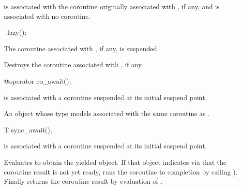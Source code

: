{\begin{itemdescr}
\pnum
\ensures
{} is associated with the coroutine
originally associated with , if any,
and  is associated with no coroutine.
\end{itemdescr}

\begin{itemdecl}
~lazy();
\end{itemdecl}

\begin{itemdescr}
\pnum
\expects
The coroutine associated with , if any, is suspended.

\pnum
\effects
Destroys the coroutine associated with , if any.
\end{itemdescr}

\begin{itemdecl}
@\unspec@ operator co_await();
\end{itemdecl}

\begin{itemdescr}
\pnum
\expects
{} is associated with a coroutine
suspended at its initial suspend point.

\returns
An object whose type models 
associated with the same coroutine as .
\end{itemdescr}

\begin{itemdecl}
T sync_await();
\end{itemdecl}

\begin{itemdescr}
\pnum
\expects
{} is associated with a coroutine
suspended at its initial suspend point.

\effects
Evaluates  to obtain
the yielded  object.
If that object indicates via  that
the coroutine result is not yet ready,
runs the coroutine to completion by calling ).
Finally returns the coroutine result
by evaluation of .
\end{itemdescr}
} %
